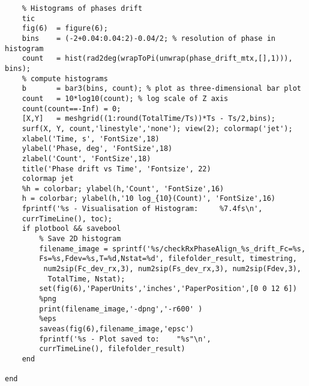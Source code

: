 \begin{verbatim}
    % Histograms of phases drift
    tic
    fig(6)  = figure(6);
    bins   	= (-2+0.04:0.04:2)-0.04/2; % resolution of phase in histogram
    count  	= hist(rad2deg(wrapToPi(unwrap(phase_drift_mtx,[],1))), bins); 
    % compute histograms
    b      	= bar3(bins, count); % plot as three-dimensional bar plot
    count   = 10*log10(count); % log scale of Z axis
    count(count==-Inf) = 0;
    [X,Y]   = meshgrid((1:round(TotalTime/Ts))*Ts - Ts/2,bins);
    surf(X, Y, count,'linestyle','none'); view(2); colormap('jet');
    xlabel('Time, s', 'FontSize',18)
    ylabel('Phase, deg', 'FontSize',18)
    zlabel('Count', 'FontSize',18)
    title('Phase drift vs Time', 'Fontsize', 22)
    colormap jet
    %h = colorbar; ylabel(h,'Count', 'FontSize',16)
    h = colorbar; ylabel(h,'10 log_{10}(Count)', 'FontSize',16)
    fprintf('%s - Visualisation of Histogram:     %7.4fs\n', 
    currTimeLine(), toc);
    if plotbool && savebool
        % Save 2D histogram
        filename_image = sprintf('%s/checkRxPhaseAlign_%s_drift_Fc=%s,
        Fs=%s,Fdev=%s,T=%d,Nstat=%d', filefolder_result, timestring,
         num2sip(Fc_dev_rx,3), num2sip(Fs_dev_rx,3), num2sip(Fdev,3),
          TotalTime, Nstat);
        set(fig(6),'PaperUnits','inches','PaperPosition',[0 0 12 6])
        %png
        print(filename_image,'-dpng','-r600' )
        %eps
        saveas(fig(6),filename_image,'epsc')
        fprintf('%s - Plot saved to:    "%s"\n', 
        currTimeLine(), filefolder_result)
    end     

end
\end{verbatim}
